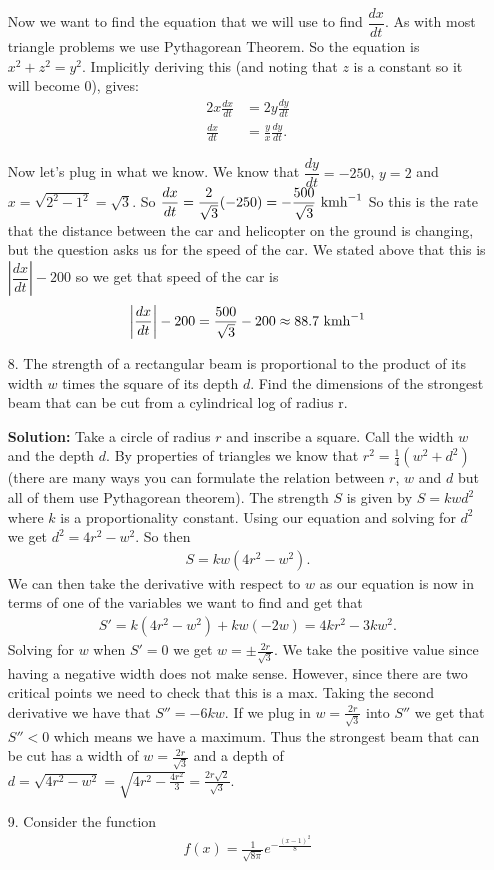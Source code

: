 \documentclass[11pt,reqno]{article}
\theoremstyle{definition}
\begin{document}
\begin{enumerate}
		Now we want to find the equation that we will use to find $\dfrac{dx}{dt}$. As with most triangle problems we use Pythagorean Theorem. So the equation is $x^2 + z^2 = y^2$. Implicitly deriving this (and noting that $z$ is a constant so it will become 0), gives:
		\begin{align*}
			2x \frac{dx}{dt} &= 2y\frac{dy}{dt} \\
			\frac{dx}{dt} &= \frac{y}{x} \frac{dy}{dt}.
		\end{align*}
		
		Now let's plug in what we know. We know that $\dfrac{dy}{dt} = -250$, $y = 2$ and $x = \sqrt{2^2 - 1^2} = \sqrt{3}$. So $\dfrac{dx}{dt} = \dfrac{2}{\sqrt{3}} (-250) = -\dfrac{500}{\sqrt{3}} \textnormal{ kmh}^{-1}$ So this is the rate that the distance between the car and helicopter on the ground is changing, but the question asks us for the speed of the car. We stated above that this is $\left|\dfrac{dx}{dt}\right| - 200$ so we get that speed of the car is 
		\begin{align*}
			\left|\dfrac{dx}{dt}\right| - 200 = \frac{500}{\sqrt{3}} - 200 \approx 88.7 \textnormal{ kmh}^{-1}
		\end{align*} 
		
		\newpage
		\item[8.] The strength of a rectangular beam is proportional to the product of its width $w$ times the square of its depth $d$. Find the dimensions of the strongest beam that can be cut from a cylindrical log of radius r.
		
		\textbf{Solution:} Take a circle of radius $r$ and inscribe a square. Call the width $w$ and the depth $d$. By properties of triangles we know that $r^2 = \frac{1}{4}(w^2 + d^2)$ (there are many ways you can formulate the relation between $r$, $w$ and $d$ but all of them use Pythagorean theorem). The strength $S$ is given by $S = k w d^2$ where $k$ is a proportionality constant. Using our equation and solving for $d^2$ we get $d^2 = 4r^2 - w^2$. So then 
		\begin{align*}
			S = k w(4r^2 -w^2). 
		\end{align*}
		We can then take the derivative with respect to $w$ as our equation is now in terms of one of the variables we want to find and get that \begin{align*}
			S' = k(4r^2 -w^2) + kw(-2w) = 4k r^2 - 3 k w^2.
		\end{align*}
		Solving for $w$ when $S' = 0$ we get $w = \pm \frac{2r}{\sqrt{3}}$. We take the positive value since having a negative width does not make sense. However, since there are two critical points we need to check that this is a max. Taking the second derivative we have that $S'' = -6 kw$. If we plug in $w = \frac{2r}{\sqrt{3}}$ into $S''$ we get that $S'' < 0$ which means we have a maximum. Thus the strongest beam that can be cut has a width of $w = \frac{2r}{\sqrt{3}}$ and a depth of $d = \sqrt{4r^2 - w^2} = \sqrt{4r^2 - \frac{4r^2}{3}} = \frac{2r\sqrt{2}}{\sqrt{3}}$. 
		\newpage
		\item[9.] Consider the function
		\begin{align*}
			f(x) = \frac{1}{\sqrt{8 \pi}} e^{- \frac{(x - 1)^2}{8}}
		\end{align*}
		

\end{enumerate}
\end{document}
